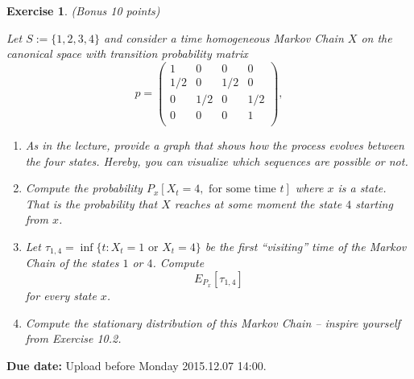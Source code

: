 \documentclass[DIV=classic,a4paper,10pt]{scrartcl}
\newtheorem{exercise}[theorem]{Exercise}
\theoremstyle{nonumberplain}
\newtheorem{proof}{Proof}
\numberwithin{equation}{section}
\begin{document}
\begin{exercise}(Bonus 10 points)

    Let $S:=\{1,2,3,4\}$ and consider a time homogeneous Markov Chain $X$ on the canonical space with transition probability matrix
    \begin{equation*}
        p=
        \begin{pmatrix}
            1   & 0   & 0   & 0 \\
            1/2 & 0   & 1/2 & 0 \\
            0   & 1/2 & 0   & 1/2 \\
            0   & 0   & 0   & 1 \\
        \end{pmatrix},
    \end{equation*}
    \begin{enumerate}[label=\textit{\alph*)},fullwidth]
        \item As in the lecture, provide a graph that shows how the process evolves between the four states.
            Hereby, you can visualize which sequences are possible or not.
        \item Compute the probability $P_x[X_t=4, \text{ for some time }t]$ where $x$ is a state.
            That is the probability that $X$ reaches at some moment the state $4$ starting from $x$.
        \item Let $\tau_{1,4}=\inf\{t\colon X_t=1\text{ or }X_t=4\}$ be the first ``visiting'' time of the Markov Chain of the states $1$ or $4$.
            Compute 
            \begin{equation*}
                E_{P_x}\left[ \tau_{1,4} \right]
            \end{equation*}
            for every state $x$.
        \item Compute the stationary distribution of this Markov Chain -- inspire yourself from Exercise 10.2.
    \end{enumerate}
\end{exercise}




\smallskip
\noindent
\textbf{Due date:} Upload before Monday 2015.12.07 14:00.
\end{document}
